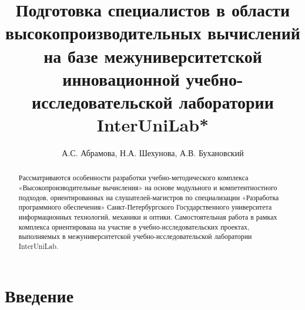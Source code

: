 \documentclass[12pt]{article}
\begin{document}
\title
{Подготовка специалистов в области
	высокопроизводительных вычислений на базе
	межуниверситетской инновационной
	учебно-исследовательской лаборатории InterUniLab*}
\author{А.С. Абрамова, Н.А. Шехунова, А.В. Бухановский}
\maketitle
\begin{abstract}
Рассматриваются особенности разработки учебно-методического комплекса «Высокопроизводительные вычисления» на основе модульного и компетентностного подходов, ориентированных на слушателей-магистров по специализации «Разработка программного обеспечения» Санкт-Петербургского Государственного университета информационных технологий, механики и оптики. Самостоятельная работа в рамках комплекса ориентирована на участие в учебно-исследовательских проектах, выполняемых в межуниверситетской учебно-исследовательской лаборатории InterUniLab.
\end{abstract}

\newpage
\pagestyle{plain}
\section{Введение}
\end{document}
